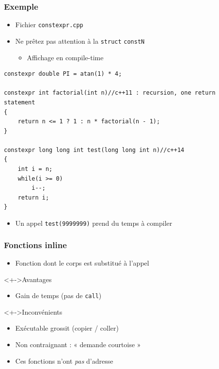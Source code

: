 \begin{frame}[containsverbatim]
\frametitle{Exemple}
\begin{itemize}
\item Fichier \texttt{constexpr.cpp}
\item Ne prêtez pas attention à la \lstinline|struct| \texttt{constN}
	\begin{itemize}
	\item Affichage en compile-time
	\end{itemize}
\end{itemize}
\begin{lstlisting}
constexpr double PI = atan(1) * 4;

constexpr int factorial(int n)//c++11 : recursion, one return statement
{
    return n <= 1 ? 1 : n * factorial(n - 1);
}

constexpr long long int test(long long int n)//c++14
{
	int i = n;
	while(i >= 0)
		i--;
	return i;
}
\end{lstlisting}
\begin{itemize}
\item Un appel \texttt{test(9999999)} prend du temps à compiler
\end{itemize}
\end{frame}

\begin{frame}
\frametitle{Fonctions inline}
\begin{itemize}[<+->]
\item Fonction dont le corps est substitué à l'appel
\end{itemize}
\begin{exampleblock}<+->{Avantages}
	\begin{itemize}[<+->]
	\item Gain de temps (pas de \texttt{call})
	\end{itemize}
\end{exampleblock}
\begin{alertblock}<+->{Inconvénients}
	\begin{itemize}[<+->]
	\item Exécutable grossit (copier / coller)
	\end{itemize}
\end{alertblock}
\begin{itemize}[<+->]
\item Non contraignant : « demande courtoise »
\item Ces fonctions n'ont \emph{pas} d'adresse
\end{itemize}
\end{frame}

